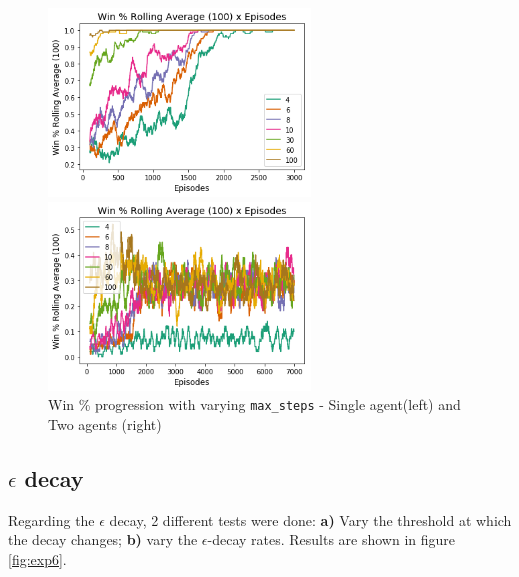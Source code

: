\documentclass[10pt]{article}
\begin{document}
        \begin{figure}[h]
            \centering
            \begin{minipage}[b]{0.4\textwidth}
                \includegraphics[height=5cm]{Images/exp_5/1_win_percent.png}
            \end{minipage}
            \hfill
            \begin{minipage}[b]{0.4\textwidth}
                \includegraphics[height=5cm]{Images/exp_5/2_win_percent.png}
            \end{minipage}
            \caption{Win \% progression with varying \texttt{max\_steps} - Single agent(left) and Two agents (right)}
            \label{fig:exp5}
        \end{figure}

    \subsection{$\epsilon$ decay}
        Regarding the $\epsilon$ decay, 2 different tests were done: \textbf{a)} Vary the threshold at which the decay changes; \textbf{b)} vary the $\epsilon$-decay rates. Results are shown in figure \ref{fig:exp6}.
\end{document}

